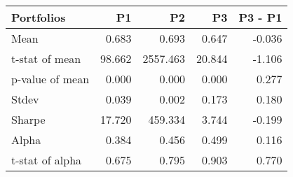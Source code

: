 \begin{tabular}{lrrrr}
\toprule
Portfolios & P1 & P2 & P3 & P3 - P1 \\
\midrule
Mean & 0.683 & 0.693 & 0.647 & -0.036 \\
t-stat of mean & 98.662 & 2557.463 & 20.844 & -1.106 \\
p-value of mean & 0.000 & 0.000 & 0.000 & 0.277 \\
Stdev & 0.039 & 0.002 & 0.173 & 0.180 \\
Sharpe & 17.720 & 459.334 & 3.744 & -0.199 \\
Alpha & 0.384 & 0.456 & 0.499 & 0.116 \\
t-stat of alpha & 0.675 & 0.795 & 0.903 & 0.770 \\
\bottomrule
\end{tabular}
